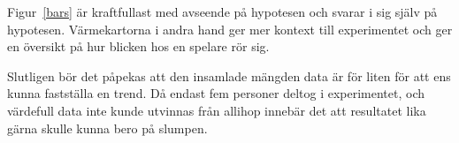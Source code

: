 \documentclass{article}
\begin{document}
Figur~\ref{bars} är kraftfullast med avseende på hypotesen och svarar i sig själv på hypotesen. Värmekartorna i andra hand ger mer kontext till experimentet och ger en översikt på hur blicken hos en spelare rör sig.

Slutligen bör det påpekas att den insamlade mängden data är för liten för att ens kunna fastställa en trend. Då endast fem personer deltog i experimentet, och värdefull data inte kunde utvinnas från allihop innebär det att resultatet lika gärna skulle kunna bero på slumpen.



\end{document}
